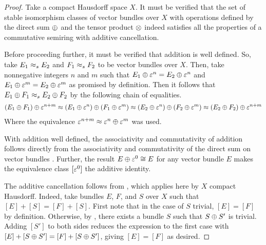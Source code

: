 \documentclass[../../sean_thesis.tex]{subfiles}
\begin{document}
	\begin{proof}
Take a compact Hausdorff space $X$. It must be verified that the set of stable isomorphism classes of vector bundles over $X$ with operations defined by the direct sum $\oplus$ and the tensor product $\otimes$ indeed satisfies all the properties of a commutative semiring with additive cancellation.
		
Before proceeding further, it must be verified that addition is well defined. So, take $E_1 \approx_s E_2$ and $F_1 \approx_s F_2$ to be vector bundles over $X$. Then, take nonnegative integers $n$ and $m$ such that $E_1 \oplus \varepsilon^{n} = E_2 \oplus \varepsilon^{n}$ and $E_1 \oplus \varepsilon^{m} = E_2 \oplus \varepsilon^{m}$ as promised by definition. Then it follows that $E_1 \oplus F_1 \approx_s E_2 \oplus F_2$ by the following chain of equalities.
\begin{align*}
	(E_1 \oplus F_1) \oplus \varepsilon^{n+m}
	\approx (E_1 \oplus \varepsilon^{n}) \oplus (F_1 \oplus \varepsilon^{m})
	\approx (E_2 \oplus \varepsilon^{n}) \oplus (F_2 \oplus \varepsilon^{m})
	\approx (E_2 \oplus F_2) \oplus \varepsilon^{n+m}
\end{align*}
Where the equivalence $\varepsilon^{n+m} \approx \varepsilon^{n} \oplus \varepsilon^{m}$  was used.		
		
With addition well defined, the associativity and commutativity of addition follows directly from the associativity and commutativity of the direct sum on vector bundles . Further, the result $E \oplus \varepsilon^{0} \cong E$ for any vector bundle $E$  makes the equivalence class $[\varepsilon^{0}]$ the additive identity.

The additive cancellation follows from , which applies here by $X$ compact Hausdorff. Indeed, take bundles $E$, $F$, and $S$ over $X$ such that $[E] + [S] = [F] + [S]$. First note that in the case of $S$ trivial, $[E] = [F]$ by definition. Otherwise, by , there exists a bundle $S$ such that $S \oplus S'$ is trivial. Adding $[S']$ to both sides reduces the expression to the first case with $[E] + [S \oplus S'] = [F] + [S \oplus S']$, giving $[E] = [F]$ as desired.
		

\end{proof}
\end{document}
